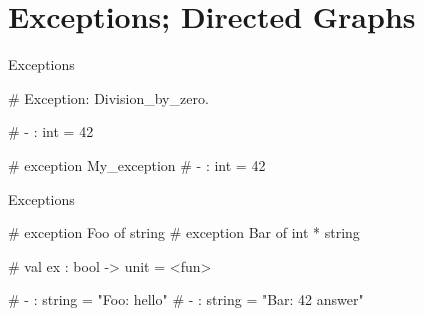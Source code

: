 \documentclass{plt}
\begin{document}
\part{Exceptions; Directed Graphs}
\frame{\partpage}

\begin{frame}[fragile]{Exceptions}

\begin{interactive}
# 
Exception: Division_by_zero.

# 
- : int = 42

# 
exception My_exception
# 
- : int = 42
\end{interactive}

\end{frame}

\begin{frame}[fragile]{Exceptions}

\begin{interactive}
# 
exception Foo of string
# 
exception Bar of int * string

# 
val ex : bool -> unit = <fun>

# 
- : string = "Foo: hello"
# 
- : string = "Bar: 42 answer"
\end{interactive}

\end{frame}

\newcommand{\graph}{
  \begin{tikzpicture}[node distance=10pt,
      every node/.style={state, inner sep=3pt,minimum size=10pt,drop shadow,fill=white}]
    \node (a) {a};
    \node (c) [right=of a] {c};
    \node (f) [right=of c] {f};
    \node (b) [above right=of c] {b};
    \node (d) [below right=of c] {d};
    \node (e) [right=of f] {e};
    \node (g) [right=of e] {g};
    \path[->] (a) edge (c)
                  edge (b)
                  edge (d)
              (c) edge (f)
              (b) edge (e)
              (d) edge (e)
              (e) edge (f)
                  edge (g);
  \end{tikzpicture}
}
\end{document}
